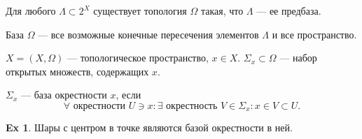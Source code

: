 \documentclass[11pt]{book}
\theoremstyle{definition}
\theoremstyle{plain}
\theoremstyle{plain}
\theoremstyle{definition}
\newtheorem*{ex}{Ex}
\theoremstyle{remark}
\begin{document}
\begin{thm}
    Для любого $ \Lambda \subset 2^{X}$ существует топология $ \Omega $ такая, что $ \Lambda$ --- ее предбаза.

    База $ \Omega $ --- все возможные конечные пересечения элементов $ \Lambda$ и все пространство.
\end{thm}
\begin{defn}
    $ X = (X, \Omega )$ --- топологическое пространство, $ x \in X$.
    $ \Sigma_x \subset \Omega $ --- набор открытых множеств, содержащих $ x$.

    $ \Sigma_x$ --- {\sf база окрестности}  $ x$, если  \[
    \forall \text{ окрестности }  U \ni x: \exists \text{ окрестность } V \in \Sigma_x: x \in V \subset U
    .\] 
\end{defn}
\begin{ex}
    Шары с центром в точке являются базой окрестности в ней. 
\end{ex}
\end{document}

